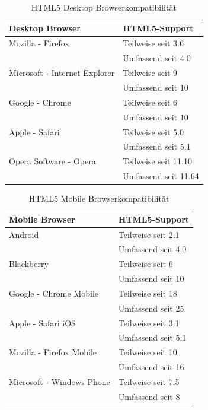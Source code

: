 \documentclass[12pt,a4paper,bibliography=totocnumbered,listof=totocnumbered]{scrartcl}
\begin{document}
\vspace{1em}
\begin{table}[!h]
	\centering
	\begin{tabular}{|l|l|}
		\hline
		\textbf{Desktop Browser} & \textbf{HTML5-Support}\\
		\hline
		Mozilla - Firefox & Teilweise seit 3.6\\
		\hline
		 & Umfassend seit 4.0\\
		\hline
		Microsoft - Internet Explorer & Teilweise seit 9\\
		\hline
		 & Umfassend seit 10\\
		\hline
		Google - Chrome & Teilweise seit 6\\
		\hline
		 & Umfassend seit 10\\
		\hline
		Apple - Safari & Teilweise seit 5.0\\
		\hline
		 & Umfassend seit 5.1\\
		\hline
		Opera Software - Opera & Teilweise seit 11.10\\
		\hline
		 & Umfassend seit 11.64\\
		\hline
	\end{tabular}
	\caption{HTML5 Desktop Browserkompatibilität}
	\label{tab:html5deskbrowserkomp}
\end{table}

\vspace{1em}
\begin{table}[!h]
	\centering
	\begin{tabular}{|l|l|}
		\hline
		\textbf{Mobile Browser} & \textbf{HTML5-Support}\\
		\hline
		Android & Teilweise seit 2.1\\
		\hline
		 & Umfassend seit 4.0\\
		\hline
		Blackberry & Teilweise seit 6\\
		\hline
		 & Umfassend seit 10\\
		\hline
		Google - Chrome Mobile & Teilweise seit 18\\
		\hline
		 & Umfassend seit 25\\
		\hline
		Apple - Safari iOS & Teilweise seit 3.1\\
		\hline
		 & Umfassend seit 5.1\\
		\hline
		Mozilla - Firefox Mobile & Teilweise seit 10\\
		\hline
		 & Umfassend seit 16\\
		\hline
		Microsoft - Windows Phone & Teilweise seit 7.5\\
		\hline
		 & Umfassend seit 8\\
		\hline
	\end{tabular}
	\caption{HTML5 Mobile Browserkompatibilität}
	\label{tab:html5mobbrowserkomp}
\end{table}
\end{document}
